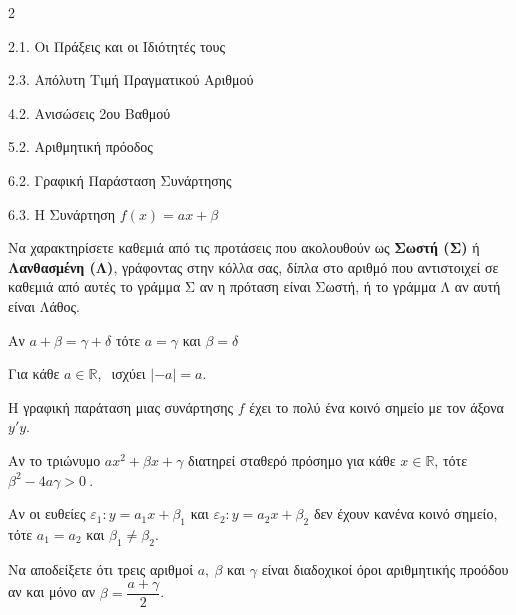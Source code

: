 \begin{ylh}{2}
    \item 2.1. Οι Πράξεις και οι Ιδιότητές τους
    \item 2.3. Απόλυτη Τιμή Πραγματικού Αριθμού
    \item 4.2. Ανισώσεις 2ου Βαθμού
    \item 5.2. Αριθμητική πρόοδος
    \item 6.2. Γραφική Παράσταση Συνάρτησης
    \item 6.3. Η Συνάρτηση $f(x)=ax+\beta$
\end{ylh}

\begin{alist}
\item Να χαρακτηρίσετε καθεμιά από τις προτάσεις που ακολουθούν ως \textbf{Σωστή (Σ)} ή \textbf{Λανθασμένη (Λ)}, γράφοντας στην κόλλα σας, δίπλα στο αριθμό που αντιστοιχεί σε καθεμιά από αυτές το γράμμα Σ αν η πρόταση είναι Σωστή, ή το γράμμα Λ αν αυτή είναι Λάθος.
\begin{rlist}
\item
  Αν $a + \beta = \gamma + \delta$ τότε $a = \gamma$ και $\beta = \delta$
\item
  Για κάθε $a\mathbb{\in R,\ }$ ισχύει $| - a| = a$.
\item
  Η γραφική παράταση μιας συνάρτησης $f$ έχει το πολύ ένα κοινό σημείο με τον άξονα $y'y$.
\item
  Αν το τριώνυμο $a x^{2} + \beta x + \gamma$ διατηρεί σταθερό πρόσημο για κάθε $x\mathbb{\in R}$, τότε\\
  $\beta^{2} - 4a\gamma > 0\ $.
\item
  Αν οι ευθείες $\varepsilon_{1}:y = a_{1}x + \beta_{1}$ και $\varepsilon_{2}:y = a_{2}x + \beta_{2}$ δεν έχουν κανένα κοινό σημείο, τότε $a_{1} = a_{2}$ και $\beta_{1} \neq \beta_{2}$.
\end{rlist}
\item Να αποδείξετε ότι τρεις αριθμοί $a,\ \beta$ και $\gamma$ είναι διαδοχικοί όροι αριθμητικής προόδου αν και μόνο αν $\beta = \dfrac{a + \gamma}{2}$.
\end{alist}

